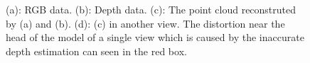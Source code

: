 \begin{figure}[ht]
  \centering
{}%
\caption{(a): RGB data. (b): Depth data. (c): The point cloud reconstruted by (a) and (b). (d): (c) in another view. The distortion near the head of the model of a single view which is caused by the inaccurate depth estimation can seen in the red box.}
\label{fig:deptherror}
\end{figure}


